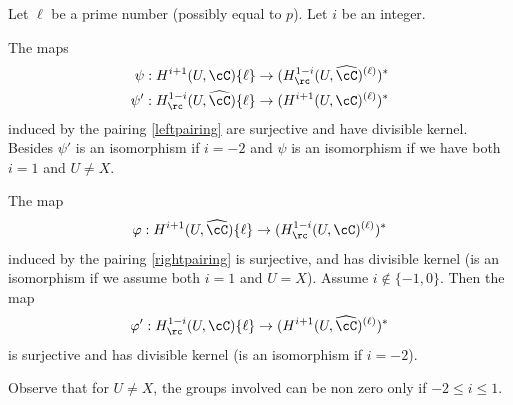 \begin{lem} \label{avlem}
Let $\ell$ be a prime number (possibly equal to $p$). Let $i$ be
an integer.
\begin{enumeratea}
\item\label{avlema}
The maps
\begin{align*}
\psi: H^{i+1}(U,\cC)\{\ell\} &\to
(H^{1-i}_\rc(U,\widehat \cC)^{(\ell)})^*
\\
\psi': H^{1-i}_\rc(U,\widehat \cC)\{\ell\} &\to
(H^{i+1}(U,\cC)^{(\ell)})^*
\end{align*}
induced by the pairing \eqref{leftpairing} are surjective
and have divisible kernel. Besides $\psi'$ is an isomorphism
if $i=-2$ and $\psi$ is an isomorphism if we have
both $i=1$ and $U \neq X$.

\item\label{avlemb}
The map
\[
\varphi: H^{i+1}(U,\widehat \cC)\{\ell\} \to
(H^{1-i}_\rc(U,\cC)^{(\ell)})^*
\]
induced by the pairing \eqref{rightpairing} is surjective, and
has divisible kernel (\resp is an isomorphism if we assume
both $i=1$ and $U=X$).
Assume $i \not \in \{-1, 0\}$. Then the map
\[
\varphi': H^{1-i}_\rc(U,\cC)\{\ell\} \to
(H^{i+1}(U,\widehat \cC)^{(\ell)})^*
\]
is surjective and has divisible kernel (\resp is an isomorphism
if $i=-2$).
\end{enumeratea}
\end{lem}

Observe that for $U \neq X$, the groups involved can be non zero only if
$-2 \leq i \leq 1$.

